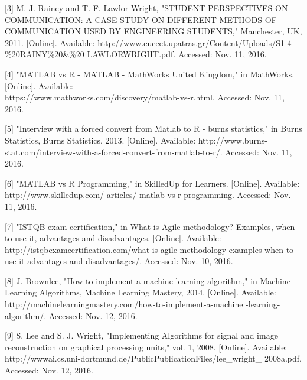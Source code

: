\documentclass[a4,draftclsnofoot,onecolumn,margin=0.75,10pt]{IEEEtran}
\begin{document}
[3]	M. J. Rainey and T. F. Lawlor-Wright, "STUDENT PERSPECTIVES ON COMMUNICATION: A CASE STUDY ON DIFFERENT METHODS OF COMMUNICATION USED BY ENGINEERING STUDENTS," Manchester, UK, 2011. [Online]. Available: http://www.euceet.upatras.gr/Content/Uploads/S1-4 \%20RAINY\%20\&\%20 LAWLOR\-WRIGHT.pdf. Accessed: Nov. 11, 2016.
\par\null\par

[4]	"MATLAB vs R - MATLAB - MathWorks United Kingdom," in MathWorks. [Online]. Available:\\ https://www.mathworks.com/discovery/matlab-vs-r.html. Accessed: Nov. 11, 2016.
\par\null\par

[5]	"Interview with a forced convert from Matlab to R - burns statistics," in Burns Statistics, Burns Statistics, 2013. [Online]. Available: http://www.burns-stat.com/interview-with-a-forced-convert-from-matlab-to-r/. Accessed: Nov. 11, 2016.
\par\null\par

[6]	"MATLAB vs R Programming," in SkilledUp for Learners. [Online]. Available: http://www.skilledup.com/ articles/
matlab-vs-r-programming. Accessed: Nov. 11, 2016.
\par\null\par

[7]	"ISTQB exam certification," in What is Agile methodology? Examples, when to use it, advantages and disadvantages. [Online]. Available: http://istqbexamcertification.com/what-is-agile-methodology-examples-when-to-use-it-advantages-and-disadvantages/. Accessed: Nov. 10, 2016.
\par\null\par

[8]	J. Brownlee, "How to implement a machine learning algorithm," in Machine Learning Algorithms, Machine Learning Mastery, 2014. [Online]. Available: http://machinelearningmastery.com/how-to-implement-a-machine -learning-algorithm/. Accessed: Nov. 12, 2016.
\par\null\par

[9]	S. Lee and S. J. Wright, "Implementing Algorithms for signal and image reconstruction on graphical processing units," vol. 1, 2008. [Online]. Available: http://www\-ai.cs.uni-dortmund.de/PublicPublicationFiles/lee\_wright\_ 2008a.pdf. Accessed: Nov. 12, 2016.
\end{document}
